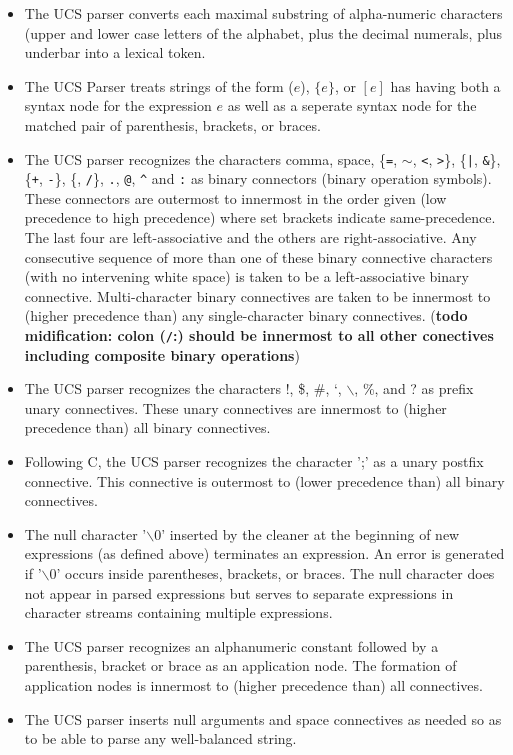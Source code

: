 \documentclass{article}
\newcommand{\mtt}[1]{\mbox{\tt #1}}
\begin{document}
\begin{itemize}
\item The UCS parser converts each maximal substring of alpha-numeric characters (upper and lower case letters of the alphabet, plus the decimal numerals, plus underbar into a lexical token.

\item The UCS Parser treats strings of the form ($e$), $\{e\}$, or $[e]$ has having both a syntax node for the expression $e$ as well as a seperate syntax node
for the matched pair of parenthesis, brackets, or braces.

\item The UCS parser recognizes the characters comma, space,
  \{\mtt{=}, \mtt{$\sim$}, \mtt{<}, \mtt{>}\}, \{\mtt{|}, \mtt{\&}\}, \{\mtt{+}, \mtt{-}\}, \{\mtt{*}, \mtt{/}\}, \mtt{.}, \mtt{@}, \mtt{\^{}} and \mtt{:} as
binary connectors (binary operation symbols).
These connectors are outermost to innermost in the order given (low precedence to high precedence) where set brackets indicate same-precedence.
The last four are left-associative and the others are right-associative.
Any consecutive sequence of more than one of these binary connective characters (with no intervening white space) is taken to be a left-associative binary connective.
Multi-character binary connectives
are taken to be innermost to (higher precedence than) any single-character binary connectives. ({\bf todo midification: colon (\mtt{/}:) should be innermost to all other conectives including composite binary operations})

\item The UCS parser recognizes the characters !, \$, \#, `, $\backslash$, \%, and ? as prefix unary connectives.  These unary connectives are innermost to (higher precedence than)
all binary connectives.

\item Following C, the UCS parser recognizes the character ';' as a unary postfix connective.  This connective is outermost to (lower precedence than) all binary connectives.

\item The null character '$\backslash$0' inserted by the cleaner at the beginning of new expressions (as defined above) terminates an expression.
  An error is generated if '$\backslash$0' occurs inside parentheses, brackets, or braces.  The null character does not appear in parsed expressions but serves to separate
  expressions in character streams containing multiple expressions.

\item The UCS parser recognizes an alphanumeric constant followed by a parenthesis, bracket or brace as an application node.  The formation of application
nodes is innermost to (higher precedence than) all connectives.

\item The UCS parser inserts null arguments and space connectives as needed so as to be able to parse any well-balanced string.
\end{itemize}
\end{document}
